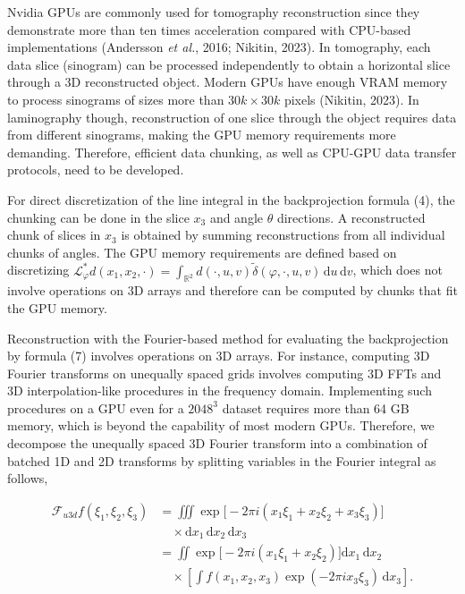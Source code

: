 \documentclass{article}
\begin{document}
Nvidia GPUs are commonly used for tomography reconstruction since they demonstrate more than ten times acceleration compared with CPU-based implementations (Andersson \emph{et al.}, 2016; Nikitin, 2023). In tomography, each data slice (sinogram) can be processed independently to obtain a horizontal slice through a 3D reconstructed object. Modern GPUs have enough VRAM memory to process sinograms of sizes more than $30k \times 30k$ pixels (Nikitin, 2023). In laminography though, reconstruction of one slice through the object requires data from different sinograms, making the GPU memory requirements more demanding. Therefore, efficient data chunking, as well as CPU-GPU data transfer protocols, need to be developed.

For direct discretization of the line integral in the backprojection formula (4), the chunking can be done in the slice $x_3$ and angle $\theta$ directions. A reconstructed chunk of slices in $x_3$ is obtained by summing reconstructions from all individual chunks of angles. The GPU memory requirements are defined based on discretizing $\mathcal{L}_\varphi^* d(x_1, x_2, \cdot) = \int_{\mathbb{R}^2} d(\cdot, u, v) \tilde{\delta}(\varphi, \cdot, u, v)\, \mathrm{d}u\, \mathrm{d}v$, which does not involve operations on 3D arrays and therefore can be computed by chunks that fit the GPU memory.

Reconstruction with the Fourier-based method for evaluating the backprojection by formula (7) involves operations on 3D arrays. For instance, computing 3D Fourier transforms on unequally spaced grids involves computing 3D FFTs and 3D interpolation-like procedures in the frequency domain. Implementing such procedures on a GPU even for a $2048^3$ dataset requires more than 64 GB memory, which is beyond the capability of most modern GPUs. Therefore, we decompose the unequally spaced 3D Fourier transform into a combination of batched 1D and 2D transforms by splitting variables in the Fourier integral as follows,

\begin{equation}
\begin{aligned} \mathcal{F}_{u3d}f(\xi_1, \xi_2, \xi_3) &= \iiint \exp\big[-2\pi i(x_1\xi_1 + x_2\xi_2 + x_3\xi_3)\big] \\ &\quad \times \mathrm{d}x_1\, \mathrm{d}x_2\, \mathrm{d}x_3 \\ &= \iint \exp\big[-2\pi i(x_1\xi_1 + x_2\xi_2)\big] \mathrm{d}x_1\, \mathrm{d}x_2 \\ &\quad \times \left[ \int f(x_1, x_2, x_3) \exp(-2\pi i x_3 \xi_3)\, \mathrm{d}x_3 \right]. \end{aligned}
\tag{9}
\end{equation}
\end{document}
